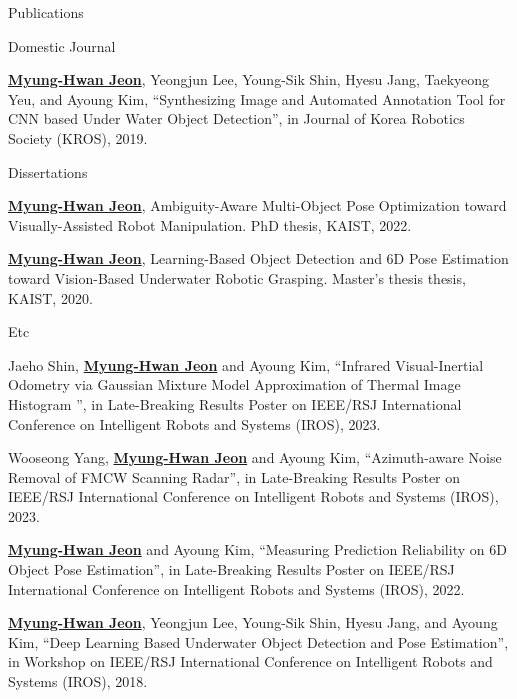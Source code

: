 \begin{rSection}{Publications}
\begin{pubSubsection}{Domestic Journal}
  \item\underline{\textbf{Myung-Hwan Jeon}}, Yeongjun Lee, Young-Sik Shin, Hyesu Jang, Taekyeong Yeu, and Ayoung Kim, “Synthesizing Image and Automated Annotation Tool for CNN based Under Water Object Detection”, in Journal of Korea Robotics Society (KROS), 2019.
  
\end{pubSubsection}

\begin{pubSubsection}{Dissertations}
  \item \underline{\textbf{Myung-Hwan Jeon}}, Ambiguity-Aware Multi-Object Pose Optimization toward Visually-Assisted Robot Manipulation. PhD thesis, \acf{KAIST}, 2022.
  
  \item \underline{\textbf{Myung-Hwan Jeon}}, Learning-Based Object Detection and 6D Pose Estimation toward Vision-Based Underwater Robotic Grasping. Master's thesis thesis, \acf{KAIST}, 2020.
  
\end{pubSubsection}

\begin{pubSubsection}{Etc}

  \item Jaeho Shin, \underline{\textbf{Myung-Hwan Jeon}} and Ayoung Kim, “Infrared Visual-Inertial Odometry via Gaussian Mixture Model Approximation of Thermal Image Histogram ”, in Late-Breaking Results Poster on IEEE/RSJ International Conference on Intelligent Robots and Systems (IROS), 2023.  
  
  \item Wooseong Yang, \underline{\textbf{Myung-Hwan Jeon}} and Ayoung Kim, “Azimuth-aware Noise Removal of FMCW Scanning Radar”, in Late-Breaking Results Poster on IEEE/RSJ International Conference on Intelligent Robots and Systems (IROS), 2023.  

  \item \underline{\textbf{Myung-Hwan Jeon}} and Ayoung Kim, “Measuring Prediction Reliability on 6D Object Pose Estimation”, in Late-Breaking Results Poster on IEEE/RSJ International Conference on Intelligent Robots and Systems (IROS), 2022.  

  \item \underline{\textbf{Myung-Hwan Jeon}}, Yeongjun Lee, Young-Sik Shin, Hyesu Jang, and Ayoung Kim, “Deep Learning Based Underwater Object Detection and Pose Estimation”, in Workshop on IEEE/RSJ International Conference on Intelligent Robots and Systems (IROS), 2018.

\end{pubSubsection} 





\end{rSection}

